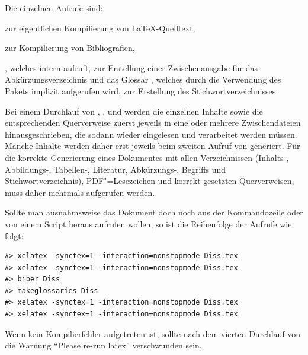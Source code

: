 Die einzelnen Aufrufe sind:
\begin{itemize*}
\item {} zur eigentlichen Kompilierung von \LaTeX-Quelltext,
\item {} zur Kompilierung von Bibliografien,
\item {}, welches intern  aufruft,
zur Erstellung einer Zwischenausgabe für das Abkürzungsverzeichnis und das Glossar
, welches durch die Verwendung des Pakets  implizit aufgerufen wird, zur Erstellung des Stichwortverzeichnisses
\end{itemize*}
Bei einem Durchlauf von , ,  und 
werden die einzelnen Inhalte sowie die entsprechenden Querverweise
zuerst jeweils in eine oder mehrere Zwischendateien hinausgeschrieben,
die sodann wieder eingelesen und verarbeitet werden müssen.
Manche Inhalte werden daher erst jeweils beim zweiten Aufruf von  generiert.
Für die korrekte Generierung eines Dokumentes mit allen Verzeichnissen
(Inhalts-, Abbildungs-, Tabellen-, Literatur, Abkürzungs-, Begriffs und Stichwortverzeichnis),
PDF"=Lesezeichen und korrekt gesetzten Querverweisen,
muss  daher mehrmals aufgerufen werden.

Sollte man ausnahmsweise das Dokument doch noch aus der Kommandozeile oder von einem Script heraus aufrufen wollen,
so ist die Reihenfolge der Aufrufe wie folgt:
\begin{verbatim}
#> xelatex -synctex=1 -interaction=nonstopmode Diss.tex
#> xelatex -synctex=1 -interaction=nonstopmode Diss.tex
#> biber Diss
#> makeglossaries Diss
#> xelatex -synctex=1 -interaction=nonstopmode Diss.tex
#> xelatex -synctex=1 -interaction=nonstopmode Diss.tex
\end{verbatim}

Wenn kein Kompilierfehler aufgetreten ist,
sollte nach dem vierten Durchlauf von  die
Warnung \enquote{Please re-run latex}
verschwunden sein.